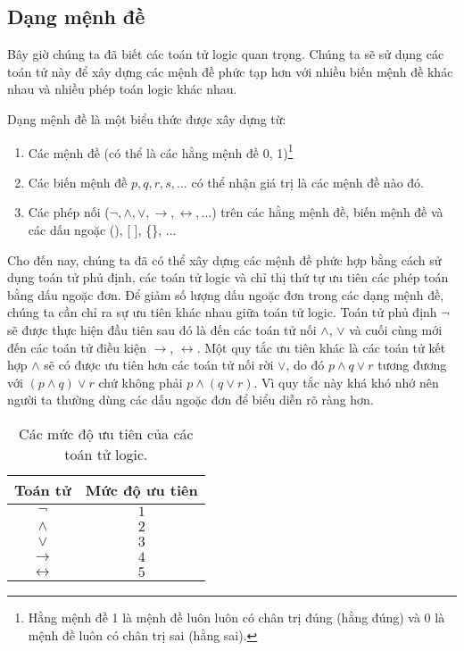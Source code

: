 \documentclass{standalone} %
\begin{document}
    \subsection{Dạng mệnh đề} 
        Bây giờ chúng ta đã biết các toán tử logic quan trọng. Chúng ta sẽ sử dụng các toán tử này để xây dựng các mệnh đề phức tạp hơn với nhiều biến mệnh đề khác nhau và nhiều phép toán logic khác nhau.
        
        \begin{definition}
            Dạng mệnh đề là một biểu thức được xây dựng từ:
            \begin{enumerate}
                \item Các mệnh đề (có thể là các hằng mệnh đề 0, 1)\footnote{
                    Hằng mệnh đề 1 là mệnh đề luôn luôn có chân trị đúng (hằng đúng) và 0 là mệnh đề luôn có chân trị sai (hằng sai).
                }
                \item Các biến mệnh đề $p, q, r, s, ...$ có thể nhận giá trị là các mệnh đề nào đó.
                \item Các phép nối ($\neg, \land, \lor, \to, \leftrightarrow, ...$) trên các hằng mệnh đề, biến mệnh đề và các dấu ngoặc (), [ ], \{\}, ...
            \end{enumerate}
        \end{definition}
        
        Cho đến nay, chúng ta đã có thể xây dựng các mệnh đề phức hợp bằng cách sử dụng toán tử phủ định, các toán tử logic và chỉ thị thứ tự ưu tiên các phép toán bằng dấu ngoặc đơn. Để giảm số lượng dấu ngoặc đơn trong các dạng mệnh đề, chúng ta cần chỉ ra sự ưu tiên khác nhau giữa toán tử logic. Toán tử phủ định $\neg$ sẽ được thực hiện đầu tiên sau đó là đến các toán tử nối $\land$, $\lor$ và cuối cùng mới đến các toán tử điều kiện $\to$, $\leftrightarrow$. Một quy tắc ưu tiên khác là các toán tử kết hợp $\land$ sẽ có được ưu tiên hơn các toán tử nối rời $\lor$, do đó $p \land q \lor r$ tương đương với $(p \land q) \lor r$ chứ không phải $p \land (q \lor r)$. Vì quy tắc này khá khó nhớ nên người ta thường dùng các dấu ngoặc đơn để biểu diễn rõ ràng hơn.
        
        \begin{table}[h!]
            \centering
            \setlength{\tabcolsep}{18pt}
            \begin{tabular}{c c}
                Toán tử & Mức độ ưu tiên \\ \hline
                $\neg$ & $1$ \\ \hline
                $\land$ & $2$ \\
                $\lor$ & $3$ \\ \hline
                $\to$ & $4$ \\
                $\leftrightarrow$ & $5$
            \end{tabular}
            \caption{Các mức độ ưu tiên của các toán tử logic.}
        \end{table}
        
\end{document}
